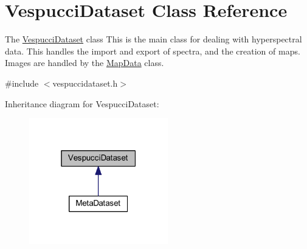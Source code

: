 \hypertarget{class_vespucci_dataset}{\section{Vespucci\+Dataset Class Reference}
\label{class_vespucci_dataset}
}


The \hyperlink{class_vespucci_dataset}{Vespucci\+Dataset} class This is the main class for dealing with hyperspectral data. This handles the import and export of spectra, and the creation of maps. Images are handled by the \hyperlink{class_map_data}{Map\+Data} class.  




{\ttfamily \#include $<$vespuccidataset.\+h$>$}



Inheritance diagram for Vespucci\+Dataset\+:\nopagebreak
\begin{figure}[H]
\begin{center}
\leavevmode
\includegraphics[width=171pt]{class_vespucci_dataset__inherit__graph}
\end{center}
\end{figure}
